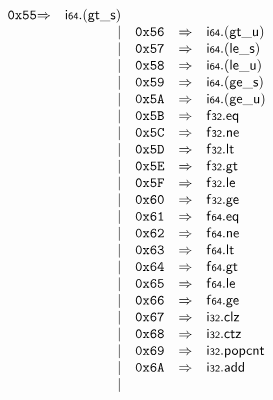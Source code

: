 $$\begin{array}{@{}l@{}rrlll@{}l@{}}
\mathtt{0x55} &\Rightarrow& \mathsf{i{\scriptstyle64}} . ({\mathsf{gt\_}}{\mathsf{s}}) \\ &&|&
\mathtt{0x56} &\Rightarrow& \mathsf{i{\scriptstyle64}} . ({\mathsf{gt\_}}{\mathsf{u}}) \\ &&|&
\mathtt{0x57} &\Rightarrow& \mathsf{i{\scriptstyle64}} . ({\mathsf{le\_}}{\mathsf{s}}) \\ &&|&
\mathtt{0x58} &\Rightarrow& \mathsf{i{\scriptstyle64}} . ({\mathsf{le\_}}{\mathsf{u}}) \\ &&|&
\mathtt{0x59} &\Rightarrow& \mathsf{i{\scriptstyle64}} . ({\mathsf{ge\_}}{\mathsf{s}}) \\ &&|&
\mathtt{0x5A} &\Rightarrow& \mathsf{i{\scriptstyle64}} . ({\mathsf{ge\_}}{\mathsf{u}}) \\ &&|&
\mathtt{0x5B} &\Rightarrow& \mathsf{f{\scriptstyle32}} . \mathsf{eq} \\ &&|&
\mathtt{0x5C} &\Rightarrow& \mathsf{f{\scriptstyle32}} . \mathsf{ne} \\ &&|&
\mathtt{0x5D} &\Rightarrow& \mathsf{f{\scriptstyle32}} . \mathsf{lt} \\ &&|&
\mathtt{0x5E} &\Rightarrow& \mathsf{f{\scriptstyle32}} . \mathsf{gt} \\ &&|&
\mathtt{0x5F} &\Rightarrow& \mathsf{f{\scriptstyle32}} . \mathsf{le} \\ &&|&
\mathtt{0x60} &\Rightarrow& \mathsf{f{\scriptstyle32}} . \mathsf{ge} \\ &&|&
\mathtt{0x61} &\Rightarrow& \mathsf{f{\scriptstyle64}} . \mathsf{eq} \\ &&|&
\mathtt{0x62} &\Rightarrow& \mathsf{f{\scriptstyle64}} . \mathsf{ne} \\ &&|&
\mathtt{0x63} &\Rightarrow& \mathsf{f{\scriptstyle64}} . \mathsf{lt} \\ &&|&
\mathtt{0x64} &\Rightarrow& \mathsf{f{\scriptstyle64}} . \mathsf{gt} \\ &&|&
\mathtt{0x65} &\Rightarrow& \mathsf{f{\scriptstyle64}} . \mathsf{le} \\ &&|&
\mathtt{0x66} &\Rightarrow& \mathsf{f{\scriptstyle64}} . \mathsf{ge} \\ &&|&
\mathtt{0x67} &\Rightarrow& \mathsf{i{\scriptstyle32}} . \mathsf{clz} \\ &&|&
\mathtt{0x68} &\Rightarrow& \mathsf{i{\scriptstyle32}} . \mathsf{ctz} \\ &&|&
\mathtt{0x69} &\Rightarrow& \mathsf{i{\scriptstyle32}} . \mathsf{popcnt} \\ &&|&
\mathtt{0x6A} &\Rightarrow& \mathsf{i{\scriptstyle32}} . \mathsf{add} \\ &&|&

\end{array}$$
